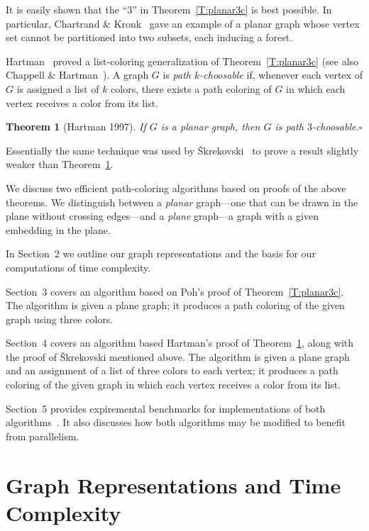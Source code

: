\documentclass[12pt,letterpaper]{article}
\theoremstyle{plain}
\newtheorem{theorem}[lemma]{Theorem}         %
\theoremstyle{definition}
\theoremstyle{break}
\newcommand{\ggcqedsymbol}{$\square$}
\newcommand{\ggcqed}{\hbox{}\nobreak\hbox{\quad\ggcqedsymbol}}
\newcommand{\ggcnopf}{\ggcqed}
\newcommand{\defterm}[1]{\emph{#1}} %
\begin{document}
It is easily shown that the ``$3$'' in Theorem~\ref{T:planar3c}
is best possible.
In particular, Chartrand \& Kronk~\cite[Section~3]{ChKr1969}
gave an example of a planar graph whose vertex set cannot be partitioned
into two subsets, each inducing a forest.

Hartman~\cite[Thm.~4.1]{Har1997}
proved a list-coloring generalization of Theorem~\ref{T:planar3c}
(see also Chappell \& Hartman~\cite[Thm.~2.1]{ChHa2017prep}).
A graph $G$ is \defterm{path $k$-choosable} if,
whenever each vertex of $G$ is assigned a list of $k$ colors,
there exists a path coloring of $G$ in which each vertex receives
a color from its list.

\begin{theorem}[Hartman 1997]\label{T:planar3}
If $G$ is a planar graph,
then $G$ is path $3$-choosable.\ggcnopf\end{theorem}

Essentially the same technique was used by
\v{S}krekovski~\cite[Thm.~2.2b]{Skr1999}
to prove a result slightly weaker than Theorem~\ref{T:planar3}.


\medskip

We discuss two efficient path-coloring algorithms
based on proofs of the above theorems.
We distinguish between a \defterm{planar} graph---one that
can be drawn in the plane without crossing edges---and
a \defterm{plane} graph---a graph with a given embedding
in the plane.

In Section~2 we outline our graph representations
and the basis for our computations of time complexity.

Section~3 covers an algorithm
based on Poh's proof of Theorem~\ref{T:planar3c}.
The algorithm is given a plane graph;
it produces a path coloring of the given graph
using three colors.

Section~4 covers an algorithm
based Hartman's proof of Theorem~\ref{T:planar3},
along with the proof of \v{S}krekovski mentioned above.
The algorithm is given a plane graph
and an assignment of a list of three colors to each vertex;
it produces a path coloring of the given graph
in which each vertex receives a color from its list.

Section~5 provides expiremental benchmarks for implementations of both
algorithms~\cite{Bro2017}. It also
discusses how both algorithms may be modified to benefit from parallelism.

\section{Graph Representations and Time Complexity}
\end{document}
